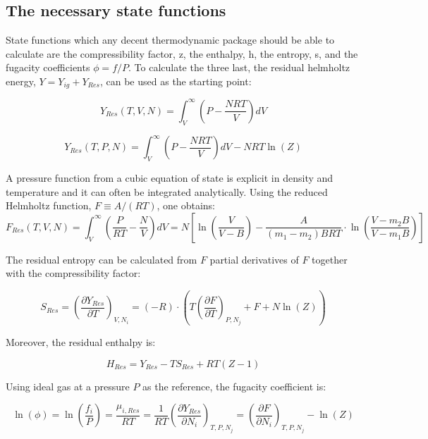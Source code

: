\documentclass[a4paper, 12pt, english, sintefheadings, sintefcolour]{sintefmemo}
\begin{document}
\subsection{The necessary state functions}
\label{sec:necfunc}
State functions which any decent thermodynamic package should be able to
calculate are the compressibility factor, z, the enthalpy, h, the entropy, s,
and the fugacity coefficients $\phi=f/P$. To calculate the three last, the
residual helmholtz energy, $Y=Y_{ig}+Y_{Res}$, can be used as the starting point:

\begin{equation} \label{eq:y_TVN}
Y_{Res}(T,V,N) =\int_{V}^{\infty}\left( P -\frac{NRT}{V}\right)dV
\end{equation}

\begin{equation} \label{eq:y}
Y_{Res}(T,P,N) =\int_{V}^{\infty}\left( P -\frac{NRT}{V}\right)dV-NRT\ln(Z)
\end{equation}

A pressure function from a cubic equation of state is explicit in density and
temperature and it can often be integrated analytically. Using the reduced Helmholtz function, 
$F\equiv A/(RT)$, one obtains:
\begin{equation}
  F_{Res}(T,V,N)=\int_{V}^{\infty}\left(\frac{P}{RT}-\frac{N}{V}\right)dV=
  N\left[\ln\left(\frac{V}{V-B}\right)-\frac{A}{\left(m_1-m_2\right)BRT}\cdot\ln\left(\frac{V-m_2B}{V-m_1B}\right) \right]
\end{equation}

The residual entropy can be calculated from $F$ partial derivatives of $F$
together with the compressibility factor:

\begin{equation}
S_{Res}=\left(\frac{\partial Y_{Res}}{\partial T}\right)_{V, N_i}=(-R)\cdot \left(T\left(\frac{\partial F}{\partial T}\right)_{P,N_j}+F+N\ln(Z)\right)
\end{equation}

Moreover, the residual enthalpy is:

\begin{equation}
H_{Res}=Y_{Res}-TS_{Res}+RT\left(Z-1\right)
\end{equation}


Using ideal gas at a pressure $P$ as the reference, the fugacity coefficient is:

\begin{equation}
\ln(\phi)=\ln\left(\frac{f_i}{P}\right)=\frac{\mu_{i,Res}}{RT}=\frac{1}{RT}\left(\frac{\partial Y_{Res}}{\partial N_i}\right)_{T,P,N_j}=\left(\frac{\partial F}{\partial N_i}\right)_{T,P,N_j}-\ln(Z)
\end{equation}
\end{document}

